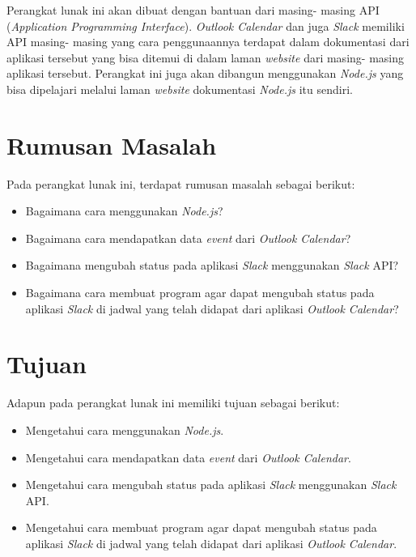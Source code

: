 \documentclass[a4paper,twoside]{article}
\begin{document}
Perangkat lunak ini akan dibuat dengan bantuan dari masing- masing API (\textit{Application Programming Interface}). \textit{Outlook Calendar} dan juga \textit{Slack} memiliki API masing- masing yang cara penggunaannya terdapat dalam dokumentasi dari aplikasi tersebut yang bisa ditemui di dalam laman \textit{website} dari masing- masing aplikasi tersebut. Perangkat ini juga akan dibangun menggunakan \textit{Node.js} yang bisa dipelajari melalui laman \textit{website} dokumentasi \textit{Node.js} itu sendiri. 

\section{Rumusan Masalah}
Pada perangkat lunak ini, terdapat rumusan masalah sebagai berikut:
\begin{itemize}
	\item Bagaimana cara menggunakan \textit{Node.js}?
	\item Bagaimana cara mendapatkan data \textit{event} dari \textit{Outlook Calendar}?
	\item Bagaimana mengubah status pada aplikasi \textit{Slack} menggunakan \textit{Slack} API?  
	\item Bagaimana cara membuat program agar dapat mengubah status pada aplikasi \textit{Slack} di jadwal yang telah didapat dari aplikasi \textit{Outlook Calendar}? 
	
\end{itemize}

\section{Tujuan}
Adapun pada perangkat lunak ini memiliki tujuan sebagai berikut:
\begin{itemize}
	\item Mengetahui cara menggunakan \textit{Node.js}. 
	\item Mengetahui cara mendapatkan data \textit{event} dari \textit{Outlook Calendar}.   
	\item Mengetahui cara mengubah status pada aplikasi \textit{Slack} menggunakan \textit{Slack} API. 
	\item Mengetahui cara membuat program agar dapat mengubah status pada aplikasi \textit{Slack} di jadwal yang telah didapat dari aplikasi \textit{Outlook Calendar}.  
	
\end{itemize}
\end{document}
